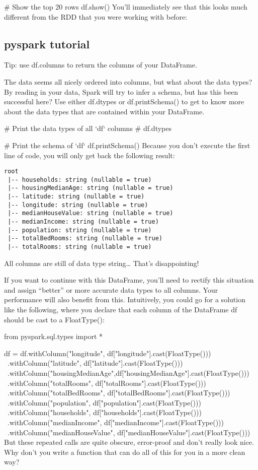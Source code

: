 \documentclass[a4paper,12pt]{article}
\begin{document}
# Show the top 20 rows 
df.show()
You’ll immediately see that this looks much different from the RDD that you were working with before:


\subsection*{pyspark tutorial}

Tip: use df.columns to return the columns of your DataFrame.

The data seems all nicely ordered into columns, but what about the data types? By reading in your data, Spark will try to infer a schema, but has this been successful here? Use either df.dtypes or df.printSchema() to get to know more about the data types that are contained within your DataFrame.

# Print the data types of all `df` columns
# df.dtypes

# Print the schema of `df`
df.printSchema()
Because you don’t execute the first line of code, you will only get back the following result:
\begin{verbatim}
root
 |-- households: string (nullable = true)
 |-- housingMedianAge: string (nullable = true)
 |-- latitude: string (nullable = true)
 |-- longitude: string (nullable = true)
 |-- medianHouseValue: string (nullable = true)
 |-- medianIncome: string (nullable = true)
 |-- population: string (nullable = true)
 |-- totalBedRooms: string (nullable = true)
 |-- totalRooms: string (nullable = true)    
\end{verbatim}

All columns are still of data type string… That’s disappointing!

If you want to continue with this DataFrame, you’ll need to rectify this situation and assign “better” or more accurate data types to all columns. Your performance will also benefit from this. Intuitively, you could go for a solution like the following, where you declare that each column of the DataFrame df should be cast to a FloatType():

from pyspark.sql.types import *

df = df.withColumn("longitude", df["longitude"].cast(FloatType())) \
   .withColumn("latitude", df["latitude"].cast(FloatType())) \
   .withColumn("housingMedianAge",df["housingMedianAge"].cast(FloatType())) \
   .withColumn("totalRooms", df["totalRooms"].cast(FloatType())) \ 
   .withColumn("totalBedRooms", df["totalBedRooms"].cast(FloatType())) \ 
   .withColumn("population", df["population"].cast(FloatType())) \ 
   .withColumn("households", df["households"].cast(FloatType())) \ 
   .withColumn("medianIncome", df["medianIncome"].cast(FloatType())) \ 
   .withColumn("medianHouseValue", df["medianHouseValue"].cast(FloatType()))
But these repeated calls are quite obscure, error-proof and don’t really look nice. Why don’t you write a function that can do all of this for you in a more clean way?
\end{document}
